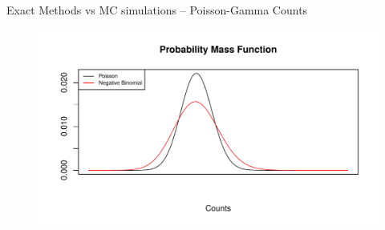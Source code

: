 \documentclass[english]{beamer}\usepackage[]{graphicx}\usepackage[]{xcolor}
\makeatletter
\def\maxwidth{ %
  \ifdim\Gin@nat@width>\linewidth
    \linewidth
  \else
    \Gin@nat@width
  \fi
}
\newenvironment{knitrout}{}{} %
\makeatother
\begin{document}
% 
% 




\begin{frame}{Exact Methods vs MC simulations -- Poisson-Gamma Counts}

\begin{figure}
\begin{knitrout}
\color{fgcolor}
\includegraphics[width=\maxwidth]{figures/figunnamed-chunk-14-1} 
\end{knitrout}
\end{figure}

\end{frame}
\end{document}
